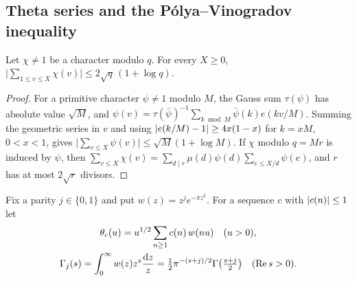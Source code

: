 \subsection{Theta series and the P\'olya--Vinogradov inequality}\label{ss:B-theta}

\begin{lemma}\label{lem:B-pv}
Let $\chi\ne1$ be a character modulo $q$. For every $X\ge0$,
$\bigl\lvert\sum_{1\le v\le X}\chi(v)\bigr\rvert\le2\sqrt q\,(1+\log q)$.
\end{lemma}

\begin{proof}
For a primitive character $\psi\ne1$ modulo $M$, the Gauss sum $\tau(\psi)$ has absolute value $\sqrt M$,
and $\psi(v)=\tau(\bar\psi)^{-1}\sum_{k\bmod M}\bar\psi(k)e(kv/M)$. Summing the geometric series in $v$
and using $\lvert e(k/M)-1\rvert\ge4x(1-x)$ for $k=xM$, $0<x<1$, gives
$\bigl\lvert\sum_{v\le X}\psi(v)\bigr\rvert\le\sqrt M(1+\log M)$. If $\chi$ modulo $q=Mr$ is induced by
$\psi$, then $\sum_{v\le X}\chi(v)=\sum_{d\mid r}\mu(d)\psi(d)\sum_{e\le X/d}\psi(e)$, and $r$ has at most
$2\sqrt r$ divisors.
\end{proof}

Fix a parity $j\in\{0,1\}$ and put $w(z)=z^je^{-\pi z^2}$. For a sequence $c$ with $\lvert c(n)\rvert\le1$ let
\begin{gather*}
  \theta_c(u)=u^{1/2}\sum_{n\ge1}c(n)\,w(nu)\quad(u>0),\\
  \Gamma_j(s)=\int_0^\infty w(z)z^s\frac{\mathop{}\!\mathrm{d} z}{z}=\tfrac12\pi^{-(s+j)/2}\Gamma\bigl(\tfrac{s+j}2\bigr)
  \quad(\operatorname{Re} s>0).
\end{gather*}

